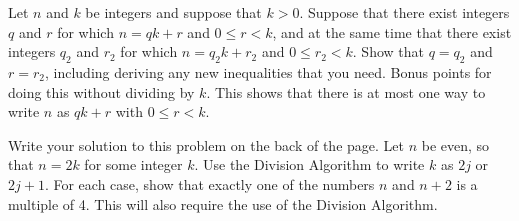 \yourname


\blist{6.5in}
\item Let $n$ and $k$ be integers and suppose that $k > 0$.
Suppose that there exist integers $q$ and $r$ for which $n = qk + r$ and $0 \leq r < k$, and at the same time that there exist integers $q_2$ and $r_2$ for which $n = q_2 k + r_2$ and $0 \leq r_2 < k$.
Show that $q = q_2$ and $r = r_2$, including deriving any new inequalities that you need.
Bonus points for doing this without dividing by $k$.
This shows that there is at most one way to write $n$ as $qk + r$ with $0 \leq r < k$.

\item Write your solution to this problem on the back of the page.
Let $n$ be even, so that $n = 2k$ for some integer $k$.
Use the Division Algorithm to write $k$ as $2j$ or $2j+1$.
For each case, show that exactly one of the numbers $n$ and $n+2$ is a multiple of 4.
This will also require the use of the Division Algorithm.

\elist
\vfill          %
